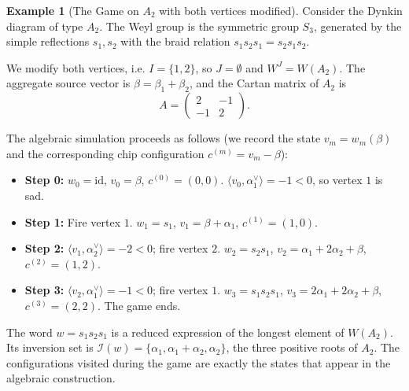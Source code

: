 \documentclass[11pt,a4paper]{amsart}
\theoremstyle{plain}
\theoremstyle{definition}
\newtheorem{example}[theorem]{Example}
\theoremstyle{remark}
\begin{document}
\begin{example}[The Game on $A_2$ with both vertices modified]
	Consider the Dynkin diagram of type $A_2$. The Weyl group is the symmetric group $S_3$, generated by the simple reflections $s_1, s_2$ with the braid relation $s_1s_2s_1 = s_2s_1s_2$.
	
	We modify both vertices, i.e. $I = \{1,2\}$, so $J = \emptyset$ and $W^J = W(A_2)$. The aggregate source vector is $\beta = \beta_1 + \beta_2$, and the Cartan matrix of $A_2$ is 
	\[
	A = \begin{pmatrix} 2 & -1 \\ -1 & 2 \end{pmatrix}.
	\]
	
	The algebraic simulation proceeds as follows (we record the state $v_m = w_m(\beta)$ and the corresponding chip configuration $c^{(m)} = v_m - \beta$):
	\begin{itemize}
		\item \textbf{Step 0:} $w_0 = \mathrm{id}$, $v_0 = \beta$, $c^{(0)} = (0,0)$. 
		$\langle v_0, \alpha_1^\vee \rangle = -1 < 0$, so vertex $1$ is sad.
		\item \textbf{Step 1:} Fire vertex $1$. $w_1 = s_1$, $v_1 = \beta + \alpha_1$, $c^{(1)} = (1,0)$.
		\item \textbf{Step 2:} $\langle v_1, \alpha_2^\vee \rangle = -2 < 0$; fire vertex $2$. $w_2 = s_2s_1$, $v_2 = \alpha_1 + 2\alpha_2 + \beta$, $c^{(2)} = (1,2)$.
		\item \textbf{Step 3:} $\langle v_2, \alpha_1^\vee \rangle = -1 < 0$; fire vertex $1$. $w_3 = s_1s_2s_1$, $v_3 = 2\alpha_1 + 2\alpha_2 + \beta$, $c^{(3)} = (2,2)$. The game ends.
	\end{itemize}
	
	The word $w = s_1s_2s_1$ is a reduced expression of the longest element of $W(A_2)$. Its inversion set is $\mathcal{I}(w) = \{\alpha_1, \alpha_1+\alpha_2, \alpha_2\}$, the three positive roots of $A_2$. The configurations visited during the game are exactly the states that appear in the algebraic construction.
	
\begin{figure}[H]
\centering
{}
\end{figure}
\end{example}
\end{document}
